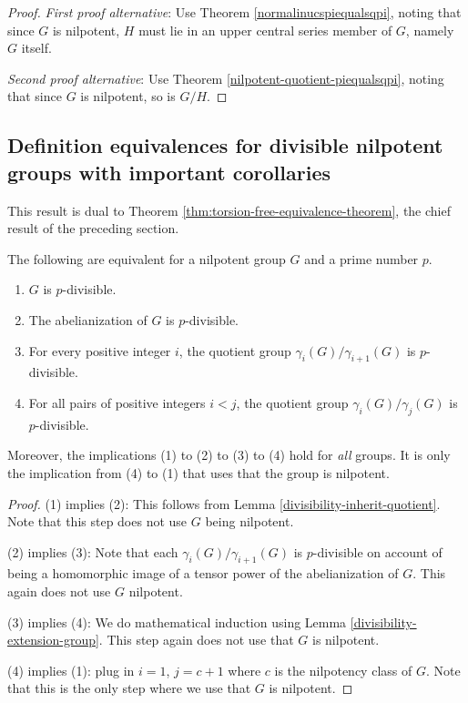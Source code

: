 \documentclass{ucetd}
\begin{document}
\begin{proof}
  {\em First proof alternative}: Use Theorem
  \ref{normalinucspiequalsqpi}, noting that since $G$ is nilpotent,
  $H$ must lie in an upper central series member of $G$, namely $G$ itself.

  {\em Second proof alternative}: Use Theorem
  \ref{nilpotent-quotient-piequalsqpi}, noting that since $G$ is
  nilpotent, so is $G/H$.
\end{proof}

\subsection{Definition equivalences for divisible nilpotent groups with important corollaries}

This result is dual to Theorem \ref{thm:torsion-free-equivalence-theorem},
the chief result of the preceding section.

\begin{theorem}\label{divisibility-equivalence-theorem}
  The following are equivalent for a nilpotent group $G$ and a prime
  number $p$.

  \begin{enumerate}
  \item $G$ is $p$-divisible.
  \item The abelianization of $G$ is $p$-divisible.
  \item For every positive integer $i$, the quotient group
    $\gamma_i(G)/\gamma_{i+1}(G)$ is $p$-divisible.
  \item For all pairs of positive integers $i < j$, the quotient group
    $\gamma_i(G)/\gamma_j(G)$ is $p$-divisible.
  \end{enumerate}

  Moreover, the implications (1) to (2) to (3) to (4) hold for
  {\em all} groups. It is only the implication from (4) to (1) that
  uses that the group is nilpotent.
\end{theorem}

\begin{proof}
  (1) implies (2): This follows from Lemma
  \ref{divisibility-inherit-quotient}. Note that this step does
  not use $G$ being nilpotent.

  (2) implies (3): Note that each $\gamma_i(G)/\gamma_{i+1}(G)$ is
  $p$-divisible on account of being a homomorphic image of a tensor
  power of the abelianization of $G$. This again does not use $G$ nilpotent.

  (3) implies (4): We do mathematical induction using Lemma
  \ref{divisibility-extension-group}. This step again does not use
  that $G$ is nilpotent.

  (4) implies (1): plug in $i = 1$, $j = c + 1$ where $c$ is the
  nilpotency class of $G$. Note that this is the only step where we
  use that $G$ is nilpotent.
\end{proof}
\end{document}
